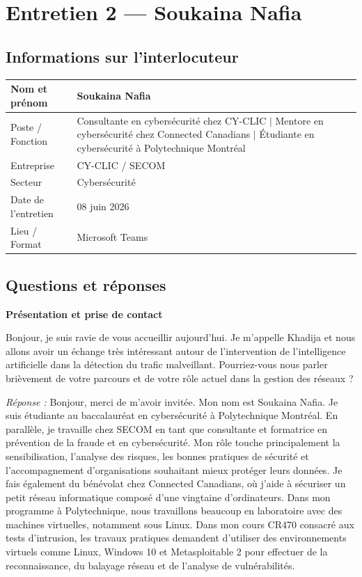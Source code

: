\documentclass[12pt,a4paper]{report}
\begin{document}
\clearpage

\section{Entretien 2 --- Soukaina Nafia}

\subsection*{Informations sur l'interlocuteur}

\begin{tabular}{@{}L{4cm} L{10.5cm}@{}}
  \hline
  Nom et pr\'{e}nom      & Soukaina Nafia \\
  \hline
  Poste / Fonction   & Consultante en cybers\'{e}curit\'{e} chez CY-CLIC $|$ Mentore en cybers\'{e}curit\'{e} chez Connected Canadians $|$ \'{E}tudiante en cybers\'{e}curit\'{e} \`{a} Polytechnique Montr\'{e}al \\
  \hline
  Entreprise         & CY-CLIC / SECOM \\
  \hline
  Secteur            & Cybers\'{e}curit\'{e} \\
  \hline
  Date de l'entretien & 08 juin 2026 \\
  \hline
  Lieu / Format      & Microsoft Teams \\
  \hline
\end{tabular}

\subsection*{Questions et réponses}

\textbf{Présentation et prise de contact}

Bonjour, je suis ravie de vous accueillir aujourd'hui. Je m'appelle Khadija et nous allons avoir un \'{e}change tr\`{e}s int\'{e}ressant autour de l'intervention de l'intelligence artificielle dans la d\'{e}tection du trafic malveillant. Pourriez-vous nous parler bri\`{e}vement de votre parcours et de votre r\^{o}le actuel dans la gestion des r\'{e}seaux ?

\medskip
\textit{R\'{e}ponse :} Bonjour, merci de m'avoir invit\'{e}e. Mon nom est Soukaina Nafia. Je suis \'{e}tudiante au baccalaur\'{e}at en cybers\'{e}curit\'{e} \`{a} Polytechnique Montr\'{e}al. En parall\`{e}le, je travaille chez SECOM en tant que consultante et formatrice en pr\'{e}vention de la fraude et en cybers\'{e}curit\'{e}. Mon r\^{o}le touche principalement la sensibilisation, l'analyse des risques, les bonnes pratiques de s\'{e}curit\'{e} et l'accompagnement d'organisations souhaitant mieux prot\'{e}ger leurs donn\'{e}es. Je fais \'{e}galement du b\'{e}n\'{e}volat chez Connected Canadians, o\`{u} j'aide \`{a} s\'{e}curiser un petit r\'{e}seau informatique compos\'{e} d'une vingtaine d'ordinateurs. Dans mon programme \`{a} Polytechnique, nous travaillons beaucoup en laboratoire avec des machines virtuelles, notamment sous Linux. Dans mon cours CR470 consacr\'{e} aux tests d'intrusion, les travaux pratiques demandent d'utiliser des environnements virtuels comme Linux, Windows 10 et Metasploitable 2 pour effectuer de la reconnaissance, du balayage r\'{e}seau et de l'analyse de vuln\'{e}rabilit\'{e}s.
\end{document}
